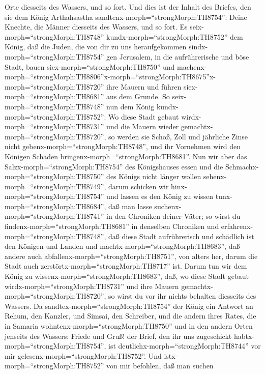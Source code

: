 Orte diesseits des Wassers, und so fort.  Und dies ist der
Inhalt des Briefes, den sie dem König Arthahsastha
sandtenx-morph=``strongMorph:TH8754'': Deine Knechte, die Männer
diesseits des Wassers, und so fort.  Es
seix-morph=``strongMorph:TH8748'' kundx-morph=``strongMorph:TH8752'' dem
König, daß die Juden, die von dir zu uns heraufgekommen
sindx-morph=``strongMorph:TH8754'' gen Jerusalem, in die aufrührerische
und böse Stadt, bauen siex-morph=``strongMorph:TH8750'' und
machenx-morph=``strongMorph:TH8806''\textbar x-morph=``strongMorph:TH8675''x-morph=``strongMorph:TH8720''
ihre Mauern und führen siex-morph=``strongMorph:TH8681'' aus dem Grunde.
 So seix-morph=``strongMorph:TH8748'' nun dem König
kundx-morph=``strongMorph:TH8752'': Wo diese Stadt gebaut
wirdx-morph=``strongMorph:TH8731'' und die Mauern wieder
gemachtx-morph=``strongMorph:TH8720'', so werden sie Schoß, Zoll und
jährliche Zinse nicht gebenx-morph=``strongMorph:TH8748'', und ihr
Vornehmen wird den Königen Schaden
bringenx-morph=``strongMorph:TH8681''.  Nun wir aber das
Salzx-morph=``strongMorph:TH8754'' des Königshauses essen und die
Schmachx-morph=``strongMorph:TH8750'' des Königs nicht länger wollen
sehenx-morph=``strongMorph:TH8749'', darum schicken wir
hinx-morph=``strongMorph:TH8754'' und lassen es den König zu wissen
tunx-morph=``strongMorph:TH8684'',  daß man lasse
suchenx-morph=``strongMorph:TH8741'' in den Chroniken deiner Väter; so
wirst du findenx-morph=``strongMorph:TH8681'' in denselben Chroniken und
erfahrenx-morph=``strongMorph:TH8748'', daß diese Stadt aufrührerisch
und schädlich ist den Königen und Landen und
machtx-morph=``strongMorph:TH8683'', daß andere auch
abfallenx-morph=``strongMorph:TH8751'', von alters her, darum die Stadt
auch zerstörtx-morph=``strongMorph:TH8717'' ist.  Darum tun
wir dem König zu wissenx-morph=``strongMorph:TH8683'', daß, wo diese
Stadt gebaut wirdx-morph=``strongMorph:TH8731'' und ihre Mauern
gemachtx-morph=``strongMorph:TH8720'', so wirst du vor ihr nichts
behalten diesseits des Wassers.  Da
sandtex-morph=``strongMorph:TH8754'' der König ein Antwort an Rehum, den
Kanzler, und Simsai, den Schreiber, und die andern ihres Rates, die in
Samaria wohntenx-morph=``strongMorph:TH8750'' und in den andern Orten
jenseits des Wassers: Friede und Gruß!  der Brief, den ihr
uns zugeschickt habtx-morph=``strongMorph:TH8754'', ist
deutlichx-morph=``strongMorph:TH8744'' vor mir
gelesenx-morph=``strongMorph:TH8752''.  Und
istx-morph=``strongMorph:TH8752'' von mir befohlen, daß man suchen
